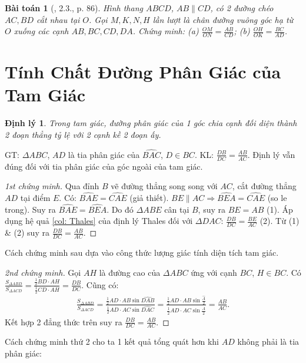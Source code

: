 \documentclass{article}
\newtheorem{baitoan}{Bài toán}
\newtheorem{dinhly}{Định lý}
\begin{document}
\begin{baitoan}[\cite{SBT_Toan_8_tap_2}, 2.3., p. 86]
	Hình thang $ABCD$, $AB\parallel CD$, có 2 đường chéo $AC,BD$ cắt nhau tại $O$. Gọi $M,K,N,H$ lần lượt là chân đường vuông góc hạ từ $O$ xuống các cạnh $AB,BC,CD,DA$. Chứng minh: (a) $\frac{OM}{ON} = \frac{AB}{CD}$; (b) $\frac{OH}{OK} = \frac{BC}{AD}$.
\end{baitoan}


\section{Tính Chất Đường Phân Giác của Tam Giác}

\begin{dinhly}
	Trong tam giác, đường phân giác của 1 góc chia cạnh đối diện thành 2 đoạn thẳng tỷ lệ với 2 cạnh kề 2 đoạn ấy.
\end{dinhly}
GT: $\Delta ABC$, $AD$ là tia phân giác của $\widehat{BAC}$, $D\in BC$. KL: $\frac{DB}{DC} = \frac{AB}{AC}$. Định lý vẫn đúng đối với tia phân giác của  góc ngoài của tam giác.

\begin{proof}[1st chứng minh]
	Qua đỉnh $B$ vẽ đường thẳng song song với $AC$, cắt đường thẳng $AD$ tại điểm $E$. Có: $\widehat{BAE} = \widehat{CAE}$ (giả thiết). $BE\parallel AC\Rightarrow\widehat{BEA} = \widehat{CAE}$ (so le trong). Suy ra $\widehat{BAE} = \widehat{BEA}$. Do đó $\Delta ABE$ cân tại $B$, suy ra $BE = AB$ (1). Áp dụng hệ quả \ref{col: Thales} của định lý Thales đối với $\Delta DAC$: $\frac{DB}{DC} = \frac{BE}{AC}$ (2). Từ (1) \& (2) suy ra $\frac{DB}{DC} = \frac{AB}{AC}$.
\end{proof}
Cách chứng minh sau dựa vào công thức lượng giác tính diện tích tam giác.
\begin{proof}[2nd chứng minh]
	Gọi $AH$ là đường cao của $\Delta ABC$ ứng với cạnh $BC$, $H\in BC$. Có $\frac{S_{\Delta ABD}}{S_{\Delta ACD}} = \frac{\frac{1}{2}BD\cdot AH}{\frac{1}{2}CD\cdot AH} = \frac{DB}{DC}$. Cũng có:
	\begin{align*}
		\frac{S_{\Delta ABD}}{S_{\Delta ACD}} = \frac{\frac{1}{2}AD\cdot AB\sin\widehat{DAB}}{\frac{1}{2}AD\cdot AC\sin\widehat{DAC}} = \frac{\frac{1}{2}AD\cdot AB\sin\frac{\widehat{A}}{2}}{\frac{1}{2}AD\cdot AC\sin\frac{\widehat{A}}{2}} = \frac{AB}{AC}.
	\end{align*}
	Kết hợp 2 đẳng thức trên suy ra $\frac{DB}{DC} = \frac{AB}{AC}$.
\end{proof}
Cách chứng minh thứ 2 cho ta 1 kết quả tổng quát hơn khi $AD$ không phải là tia phân giác:
\end{document}
